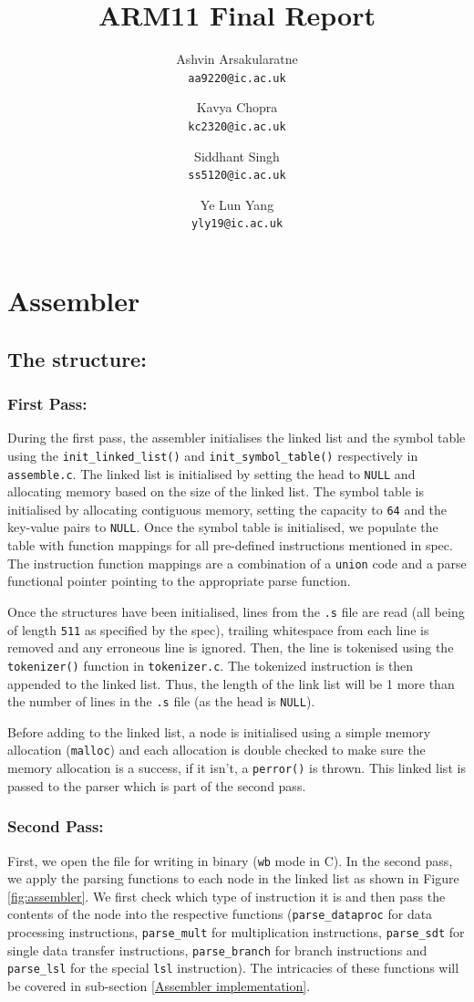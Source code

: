 \documentclass[a4paper]{article}
\title{\textbf{ARM11 Final Report}}
\author{
  Ashvin Arsakularatne\\
  \texttt{aa9220@ic.ac.uk}
  \and
  Kavya Chopra\\
  \texttt{kc2320@ic.ac.uk}
  \and
  Siddhant Singh\\
  \texttt{ss5120@ic.ac.uk}
  \and
  Ye Lun Yang\\
  \texttt{yly19@ic.ac.uk}
}
\begin{document}
\maketitle

\section{Assembler}
\subsection{The structure:}
\subsubsection{First Pass: }
During the first pass, the assembler initialises the linked list and the symbol table using the \verb|init_linked_list()| and \verb|init_symbol_table()| respectively in \verb|assemble.c|. The linked list is initialised by setting the head to \verb|NULL| and allocating memory based on the size of the linked list. The symbol table is initialised by allocating contiguous memory, setting the capacity to \verb|64| and the key-value pairs to \verb|NULL|. Once the symbol table is initialised, we populate the table with function mappings for all pre-defined instructions mentioned in spec. The instruction function mappings are a combination of a \verb|union| code and a parse functional pointer pointing to the appropriate parse function. 

Once the structures have been initialised, lines from the \verb|.s| file are read (all being of length \verb|511| as specified by the spec), trailing whitespace from each line is removed and any erroneous line is ignored. Then, the line is tokenised using the \verb|tokenizer()| function in \verb|tokenizer.c|. The tokenized instruction is then appended to the linked list. Thus, the length of the link list will be 1 more than the number of lines in the \verb|.s| file (as the head is \verb|NULL|). 

Before adding to the linked list, a node is initialised using a simple memory allocation (\verb|malloc|) and each allocation is double checked to make sure the memory allocation is a success, if it isn't, a \verb|perror()| is thrown. This linked list is passed to the parser which is part of the second pass.

\subsubsection{Second Pass: }
First, we open the file for writing in binary (\verb|wb| mode in C). In the second pass, we apply the parsing functions to each node in the linked list as shown in Figure \ref{fig:assembler}. We first check which type of instruction it is and then pass the contents of the node into the respective functions (\verb|parse_dataproc| for data processing instructions, \verb|parse_mult| for multiplication instructions, \verb|parse_sdt| for single data transfer instructions, \verb|parse_branch| for branch instructions and \verb|parse_lsl| for the special \verb|lsl| instruction). The intricacies of these functions will be covered in sub-section \ref{Assembler implementation}. 
\end{document}
